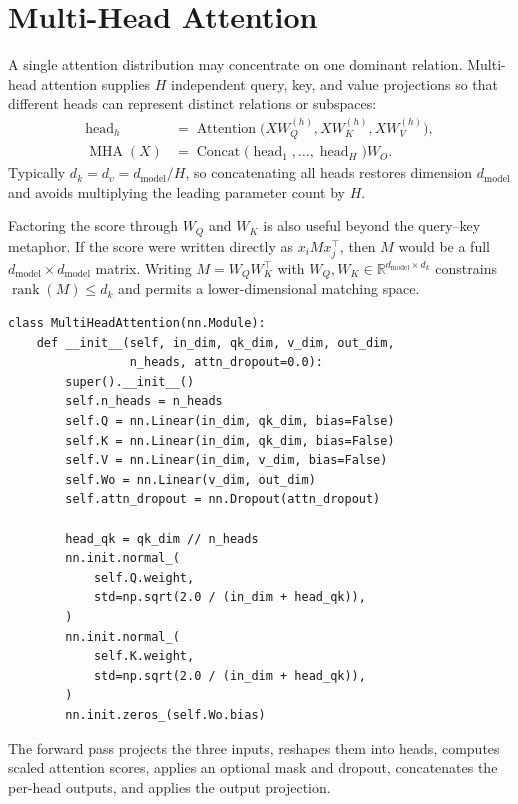 \documentclass[11pt]{article}
\newcommand{\R}{\mathbb{R}}
\newcommand{\MHA}{\operatorname{MHA}}
\begin{document}
\section{Multi-Head Attention}
\label{sec:mha}

A single attention distribution may concentrate on one dominant relation. Multi-head attention supplies $H$ independent query, key, and value projections so that different heads can represent distinct relations or subspaces:
\begin{align}
  \operatorname{head}_h
  &=\operatorname{Attention}
  \bigl(XW_Q^{(h)},XW_K^{(h)},XW_V^{(h)}\bigr), \\
  \MHA(X)
  &=\operatorname{Concat}
  \bigl(\operatorname{head}_1,\ldots,\operatorname{head}_H\bigr)W_O.
\end{align}
Typically $d_k=d_v=d_{\mathrm{model}}/H$, so concatenating all heads restores dimension $d_{\mathrm{model}}$ and avoids multiplying the leading parameter count by $H$.

Factoring the score through $W_Q$ and $W_K$ is also useful beyond the query--key metaphor. If the score were written directly as $x_i M x_j^\top$, then $M$ would be a full $d_{\mathrm{model}}\times d_{\mathrm{model}}$ matrix. Writing $M=W_QW_K^\top$ with $W_Q,W_K\in\R^{d_{\mathrm{model}}\times d_k}$ constrains $\operatorname{rank}(M)\le d_k$ and permits a lower-dimensional matching space.

\begin{lstlisting}[caption={Multi-head attention layer.},label={lst:mha_init}]
class MultiHeadAttention(nn.Module):
    def __init__(self, in_dim, qk_dim, v_dim, out_dim,
                 n_heads, attn_dropout=0.0):
        super().__init__()
        self.n_heads = n_heads
        self.Q = nn.Linear(in_dim, qk_dim, bias=False)
        self.K = nn.Linear(in_dim, qk_dim, bias=False)
        self.V = nn.Linear(in_dim, v_dim, bias=False)
        self.Wo = nn.Linear(v_dim, out_dim)
        self.attn_dropout = nn.Dropout(attn_dropout)

        head_qk = qk_dim // n_heads
        nn.init.normal_(
            self.Q.weight,
            std=np.sqrt(2.0 / (in_dim + head_qk)),
        )
        nn.init.normal_(
            self.K.weight,
            std=np.sqrt(2.0 / (in_dim + head_qk)),
        )
        nn.init.zeros_(self.Wo.bias)
\end{lstlisting}

The forward pass projects the three inputs, reshapes them into heads, computes scaled attention scores, applies an optional mask and dropout, concatenates the per-head outputs, and applies the output projection.
\end{document}
